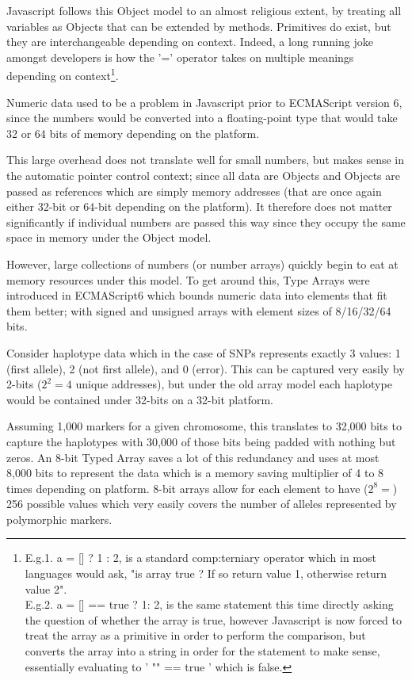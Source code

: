 Javascript follows this Object model to an almost religious extent, by treating all variables as Objects that can be extended by methods. Primitives do exist, but they are interchangeable depending on context. Indeed, a long running joke amongst developers is how the '=' operator takes on multiple meanings depending on context\footnote{

\noindent
E.g.1.		a = [] ? 1 : 2, is a standard \gls{comp:terniary} operator which in most languages would ask, "is array true ? If so return value 1, otherwise return value 2".\\\noindent
E.g.2.		a = [] == true ? 1: 2,  is the same statement this time directly asking the question of whether the array is true, however Javascript is now forced to treat the array as a primitive in order to perform the comparison, but converts the array into a string in order for the statement to make sense, essentially evaluating to ' "" == true ' which is false.
}.

Numeric data used to be a problem in Javascript prior to ECMAScript version 6, since the numbers would be converted into a floating-point type that would take 32 or 64 bits of memory depending on the platform. 

This large overhead does not translate well for small numbers, but makes sense in the automatic pointer control context; since all data are Objects and Objects are passed as references which are simply memory addresses (that are once again either 32-bit or 64-bit depending on the platform). It therefore does not matter significantly if individual numbers are passed this way since they occupy the same space in memory under the Object model. 

However, large collections of numbers (or number arrays) quickly begin to eat at memory resources under this model. To get around this, Type Arrays were introduced in ECMAScript6 which bounds numeric data into elements that fit them better; with signed and unsigned arrays with element sizes of 8/16/32/64 bits.

Consider haplotype data which in the case of SNPs represents exactly 3 values: 1 (first allele), 2 (not first allele), and 0 (error). This can be captured very easily by 2-bits ($2^2 = 4$ unique addresses), but under the old array model each haplotype would be contained under 32-bits on a 32-bit platform.

Assuming 1,000 markers for a given chromosome, this translates to 32,000 bits to capture the haplotypes with 30,000 of those bits being padded with nothing but zeros.  An 8-bit Typed Array saves a lot of this redundancy and uses at most 8,000 bits to represent the data which is a memory saving multiplier of 4 to 8 times depending on platform. 8-bit arrays allow for each element to have ($2^8 =$) 256 possible values which very easily covers the number of alleles represented by polymorphic markers.

